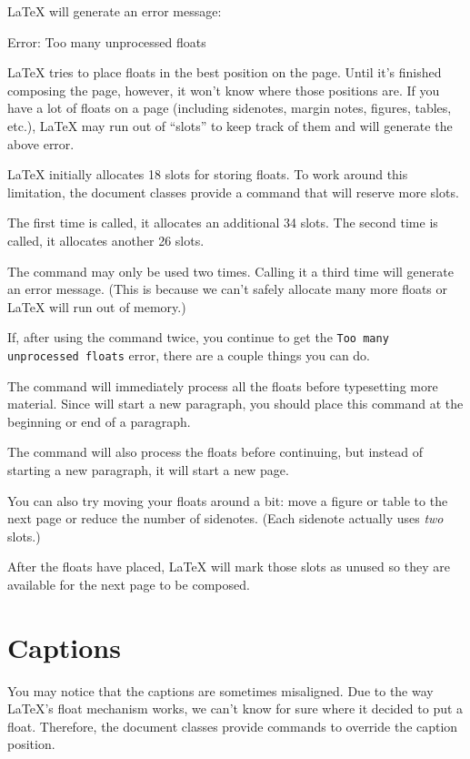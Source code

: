  \LaTeX{} will generate an error message:\label{err:too-many-floats}
\begin{docspec}
  Error: Too many unprocessed floats
\end{docspec}
\LaTeX{} tries to place floats in the best position on the page.  Until it's
finished composing the page, however, it won't know where those positions are.
If you have a lot of floats on a page (including sidenotes, margin notes,
figures, tables, etc.), \LaTeX{} may run out of ``slots'' to keep track of them
and will generate the above error.

\LaTeX{} initially allocates 18 slots for storing floats.  To work around this
limitation, the \TL document classes provide a  command
that will reserve more slots.

The first time  is called, it allocates an additional 34
slots.  The second time  is called, it allocates another 26
slots.

The  command may only be used two times.  Calling it a
third time will generate an error message.  (This is because we can't safely
allocate many more floats or \LaTeX{} will run out of memory.)

If, after using the  command twice, you continue to get the
\texttt{Too many unprocessed floats} error, there are a couple things you can
do.

The  command will immediately process all the floats
before typesetting more material.  Since  will start a new
paragraph, you should place this command at the beginning or end of a
paragraph.

The  command will also process the floats before
continuing, but instead of starting a new paragraph, it will start a new page.

You can also try moving your floats around a bit: move a figure or table to the
next page or reduce the number of sidenotes.  (Each sidenote actually uses
\emph{two} slots.)

After the floats have placed, \LaTeX{} will mark those slots as unused so they
are available for the next page to be composed.

\section{Captions}
You may notice that the captions are sometimes misaligned.
Due to the way \LaTeX's float mechanism works, we can't know for sure where it
decided to put a float. Therefore, the \TL document classes provide commands to
override the caption position.


